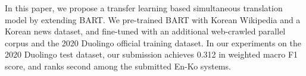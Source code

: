 In this paper, we propose a transfer learning based simultaneous translation model by extending BART. We pre-trained BART with Korean Wikipedia and a Korean news dataset, and fine-tuned with an additional web-crawled parallel corpus and the 2020 Duolingo official training dataset. In our experiments on the 2020 Duolingo test dataset, our submission achieves 0.312 in weighted macro F1 score, and ranks second among the submitted En-Ko systems.
